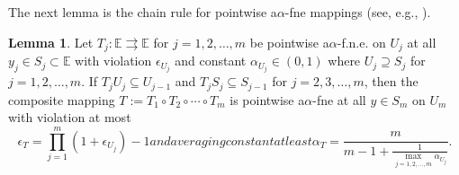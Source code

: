 \documentclass[12pt]{article}
\theoremstyle{definition}
\newtheorem{lemma}{Lemma}
\newcommand{\paren}[1]{\left(#1\right)}
\begin{document}
The next lemma is the chain rule for pointwise a$\alpha$-fne mappings
(see, e.g., \cite[Proposition 2.4 (iii)]{russell2018quantitative}).
\begin{lemma}\label{t:av-comp av}
Let $T_j:\mathbb{E}\rightrightarrows \mathbb{E}$ for $j=1,2,\dots,m$
be pointwise a$\alpha$-f.n.e. on $U_j$ at all $ y_{j}\in S_j\subset \mathbb{E}$
with violation $\epsilon_{U_j}$ and
constant $\alpha_{U_j}\in (0, 1)$ where
$U_j\supseteq S_j$ for $j=1,2,\dots,m$.
If 
$T_{j}U_{j}\subseteq U_{j-1}$ and $T_{j}S_{j}\subseteq S_{j-1}$ for $j=2,3,\dots,m$, 
then the composite mapping $T:=T_1\circ T_{2}\circ \cdots \circ  T_m$ is pointwise a$\alpha$-fne at all 
$y\in S_m$ on $U_m$ with violation at most
\begin{subequations}
\begin{equation}
    \epsilon_T=\prod_{j=1}^m(1+\epsilon_{U_j})-1
\end{equation}
and averaging constant at least
\begin{equation}%
 \alpha_T = \frac{m}{m-1 + \frac{1}{\max_{j=1,2,\dots,m}{\alpha_{U_j}}}}.
\end{equation}%
\end{subequations}
\end{lemma}
\end{document}
